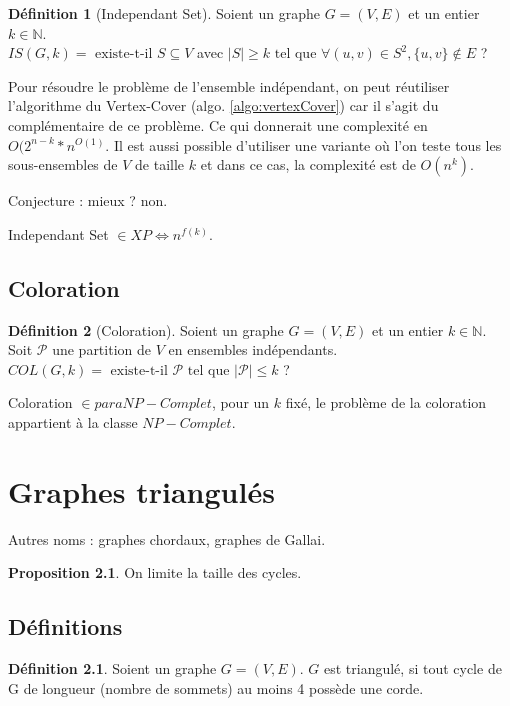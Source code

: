 \documentclass{book}
\theoremstyle{definition}
\newtheorem{definition}{Définition}
\newtheorem{proposition}{Proposition}
\numberwithin{lemma}{subsection}
\numberwithin{theorem}{subsection}
\numberwithin{definition}{subsection}
\numberwithin{proposition}{subsection}
\numberwithin{corollary}{subsection}
\numberwithin{property}{subsection}
\numberwithin{example}{subsection}
\numberwithin{heuristique}{subsection}
\numberwithin{scenario}{subsection}
\begin{document}
\begin{definition}[Independant Set]
Soient un graphe $G = (V, E)$ et un entier $k \in \mathbb{N}$. \\
$IS(G, k) = \mbox{ existe-t-il } S \subseteq V $ avec $ \left | S \right | \geqslant k \mbox{ tel que } \forall (u, v) \in S^2, \{u, v\} \notin E$ ?
\end{definition}

Pour résoudre le problème de l'ensemble indépendant, on peut réutiliser l'algorithme du Vertex-Cover (algo. \ref{algo:vertexCover}) car il s'agit du complémentaire de ce problème. Ce qui donnerait une complexité en $O(2^{n-k}*n^{O(1)}$.
Il est aussi possible d'utiliser une variante où l'on teste tous les sous-ensembles de $V$ de taille $k$ et dans ce cas, la complexité est de $O(n^k)$.

Conjecture : mieux ? non. 

Independant Set $\in XP \Leftrightarrow n^{f(k)}$.

\section{Coloration}

\begin{definition}[Coloration]
Soient un graphe $G = (V, E)$ et un entier $k \in \mathbb{N}$. Soit $\mathcal{P}$ une partition de $V$ en ensembles indépendants. \\
$COL(G, k) = \mbox{ existe-t-il } \mathcal{P} \mbox{ tel que } \left | \mathcal{P} \right | \leqslant k$ ?
\end{definition}

Coloration $\in para NP-Complet$, pour un $k$ fixé, le problème de la coloration appartient à la classe $NP-Complet$.

\chapter{Graphes triangulés}

Autres noms : graphes chordaux, graphes de Gallai.

\begin{proposition}
On limite la taille des cycles.
\end{proposition}

\section{Définitions}

\begin{definition}
Soient un graphe $G=(V, E)$. $G$ est triangulé, si tout cycle de G de longueur (nombre de sommets) au moins 4 possède une corde.
\end{definition}
\end{document}
